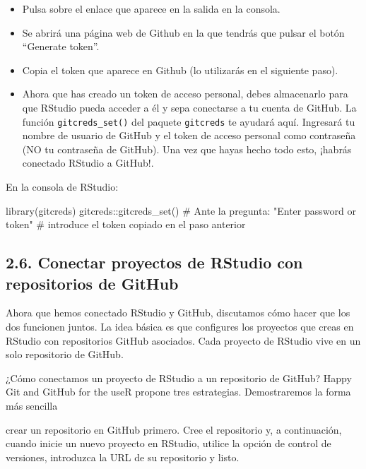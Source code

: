 \documentclass[
  letterpaper,
  DIV=11,
  numbers=noendperiod]{scrreprt}
\newenvironment{Shaded}{\begin{snugshade}}{\end{snugshade}}
\newcommand{\CommentTok}[1]{\textcolor[rgb]{0.37,0.37,0.37}{#1}}
\newcommand{\FunctionTok}[1]{\textcolor[rgb]{0.28,0.35,0.67}{#1}}
\newcommand{\NormalTok}[1]{\textcolor[rgb]{0.00,0.23,0.31}{#1}}
\newcommand{\SpecialCharTok}[1]{\textcolor[rgb]{0.37,0.37,0.37}{#1}}
\begin{document}
\begin{itemize}
\item
  Pulsa sobre el enlace que aparece en la salida en la consola.
\item
  Se abrirá una página web de Github en la que tendrás que pulsar el
  botón ``Generate token''.
\item
  Copia el token que aparece en Github (lo utilizarás en el siguiente
  paso).
\item
  Ahora que has creado un token de acceso personal, debes almacenarlo
  para que RStudio pueda acceder a él y sepa conectarse a tu cuenta de
  GitHub. La función \texttt{gitcreds\_set()} del paquete
  \texttt{gitcreds} te ayudará aquí. Ingresará tu nombre de usuario de
  GitHub y el token de acceso personal como contraseña (NO tu contraseña
  de GitHub). Una vez que hayas hecho todo esto, ¡habrás conectado
  RStudio a GitHub!.
\end{itemize}

En la consola de RStudio:

\begin{Shaded}
\begin{Highlighting}[]
\FunctionTok{library}\NormalTok{(gitcreds)}
\NormalTok{gitcreds}\SpecialCharTok{::}\FunctionTok{gitcreds\_set}\NormalTok{()}
\CommentTok{\# Ante la pregunta: "Enter password or token"}
\CommentTok{\# introduce el token copiado en el paso anterior}
\end{Highlighting}
\end{Shaded}

\hypertarget{conectar-proyectos-de-rstudio-con-repositorios-de-github}{%
\subsection{2.6. Conectar proyectos de RStudio con repositorios de
GitHub}\label{conectar-proyectos-de-rstudio-con-repositorios-de-github}}

Ahora que hemos conectado RStudio y GitHub, discutamos cómo hacer que
los dos funcionen juntos. La idea básica es que configures los proyectos
que creas en RStudio con repositorios GitHub asociados. Cada proyecto de
RStudio vive en un solo repositorio de GitHub.

¿Cómo conectamos un proyecto de RStudio a un repositorio de GitHub?
Happy Git and GitHub for the useR propone tres estrategias.
Demostraremos la forma más sencilla

crear un repositorio en GitHub primero. Cree el repositorio y, a
continuación, cuando inicie un nuevo proyecto en RStudio, utilice la
opción de control de versiones, introduzca la URL de su repositorio y
listo.
\end{document}
